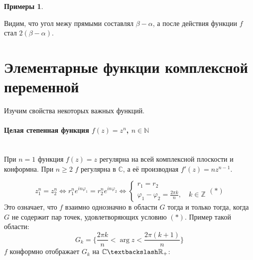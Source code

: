 \documentclass[11pt,openany,a4paper]{scrartcl}
\theoremstyle{plain}
\theoremstyle{definition}
\newtheorem{examples}[theorem]{Примеры}
\newcommand\mb{\mathbb}
\newcommand\real{\mb R}
\newcommand{\complex}{\mb C}
\newcommand\lparagraph[1]{\paragraph{#1}\mbox{}\\}
\begin{document}
\begin{examples}
\begin{itemize}
\begin{center}
	\end{center}
	Видим, что угол межу прямыми составлял $\beta - \alpha$, а после действия функции $f$ стал $2(\beta - \alpha)$.
\end{itemize}
\end{examples}

\section{Элементарные функции комплексной переменной}

Изучим свойства некоторых важных функций.

\lparagraph{Целая степенная функция $f(z) = z^n$, $n \in \mb N$}

При $n = 1$ функция $f(z) = z$ регулярна на всей комплексной плоскости и конформна. При $n \geqslant 2$ $f$ регулярна
в $\complex$, а её производная $f'(z) = nz^{n-1}$.

$$
z_1^n = z_2^n \iff r_1^ne^{in\varphi_1} = r_2^ne^{in\varphi_2} \iff
\begin{cases}
	r_1 = r_2\\
	\varphi_1 - \varphi_2 = \frac{2\pi k}{n},\quad k \in \mb Z
\end{cases}
(\ast)
$$
Это означает, что $f$ взаимно однозначно в области $G$ тогда и только тогда, когда $G$ не содержит пар точек,
удовлетворяющих условию $(\ast)$. Пример такой области:
$$
G_k = \bigg\{\frac{2\pi k}{n} < \arg z < \frac{2\pi(k + 1)}{n}\bigg\}
$$
$f$ конформно отображает $G_k$ на $\complex \textbackslash \real_+$:
\end{document}
